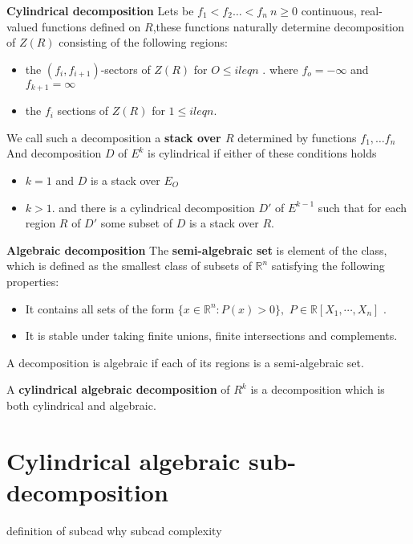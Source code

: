 \documentclass[
  digital, %
  twoside, %
  table,   %
  nolof,     %
  nolot,     %
]{fithesis3}
\begin{document}
\begin{definition}{\textbf{Cylindrical decomposition}}
\newline
Lets be $ f_1 < f_2 \dots < f_n \ n \geq 0$ continuous, real-valued functions
defined on $R$,these functions naturally determine decomposition of $Z(R)$ consisting of the following regions:
\begin{itemize}
    \item the $(f_i,f_{i+1})$-sectors of $Z(R)$ for $O \leq i leq n$ . where $f_o =  -\infty$ and $f_{k + 1} =  \infty$
    \item the $f_i$ sections of $Z (R)$ for $1 \leq i leq n$.
\end{itemize}
    We call such a decomposition a \textbf{stack over $R$} determined by functions $f_1, \dots f_n$
And  decomposition $D$ of $E^k$ is cylindrical if either of these conditions holds
\begin{itemize}
    \item  $k = 1$ and $D$ is a stack over $E_O$
    \item $k > 1$. and there is a cylindrical decomposition $D'$ of $E^{k-1}$ such that for each region $R$ of $D'$ some subset of $D$ is a stack over $R$. 
\end{itemize}
\end{definition}

\begin{definition}{\textbf{Algebraic decomposition}}
\newline
The \textbf{semi-algebraic set} is element of the class, which is defined as the smallest class of subsets of
$\mathbb{R}^{n}$ satisfying the following properties:
\begin{itemize}
    \item It contains all sets of the form $\{x\in \mathbb{R}^{n}:P(x)>0\},$ $P\in \mathbb{R}[X_{1}, \cdots, X_{n}]$ .
    \item It is stable under taking finite unions, finite intersections and complements.
\end{itemize}

A decomposition is algebraic if each of its regions is a semi-algebraic set.
\end{definition}

\begin{definition}
A \textbf{cylindrical algebraic decomposition} of $R^k$ is a decomposition which is
both cylindrical and algebraic.
\end{definition}

\section{Cylindrical algebraic sub-decomposition}
definition of subcad why subcad complexity
\end{document}
